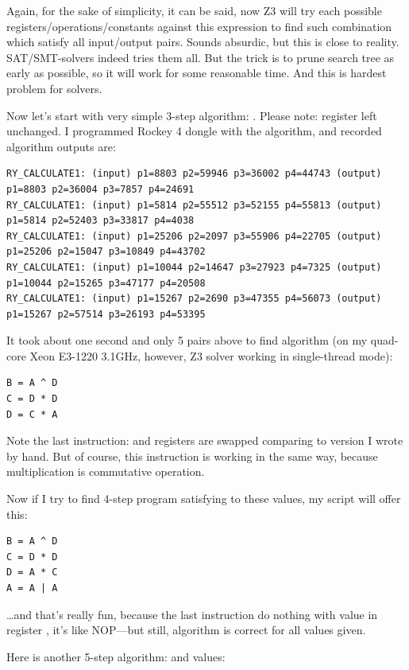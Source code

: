 Again, for the sake of simplicity, it can be said, now Z3 will try each possible
registers/operations/constants against this expression to find such combination which satisfy all input/output pairs. 
Sounds absurdic, but this is close to reality.
SAT/SMT-solvers indeed tries them all.
But the trick is to prune search tree as early as possible, so it will work for some reasonable time.
And this is hardest problem for solvers.

Now let's start with very simple 3-step algorithm: .
Please note: register  left unchanged.
I programmed Rockey 4 dongle with the algorithm, and recorded algorithm outputs are:

\begin{lstlisting}
RY_CALCULATE1: (input) p1=8803 p2=59946 p3=36002 p4=44743 (output) p1=8803 p2=36004 p3=7857 p4=24691
RY_CALCULATE1: (input) p1=5814 p2=55512 p3=52155 p4=55813 (output) p1=5814 p2=52403 p3=33817 p4=4038
RY_CALCULATE1: (input) p1=25206 p2=2097 p3=55906 p4=22705 (output) p1=25206 p2=15047 p3=10849 p4=43702
RY_CALCULATE1: (input) p1=10044 p2=14647 p3=27923 p4=7325 (output) p1=10044 p2=15265 p3=47177 p4=20508
RY_CALCULATE1: (input) p1=15267 p2=2690 p3=47355 p4=56073 (output) p1=15267 p2=57514 p3=26193 p4=53395
\end{lstlisting}

It took about one second and only 5 pairs above to find algorithm
(on my quad-core Xeon E3-1220 3.1GHz, however, Z3 solver working in single-thread mode):

\begin{lstlisting}
B = A ^ D
C = D * D
D = C * A
\end{lstlisting}

Note the last instruction:  and  registers are swapped comparing to version I wrote by hand. 
But of course, this instruction is working in the same way, because multiplication is commutative operation.

Now if I try to find 4-step program satisfying to these values, my script will offer this:

\begin{lstlisting}
B = A ^ D
C = D * D
D = A * C
A = A | A
\end{lstlisting}

\dots and that's really fun, because the last instruction do nothing with value in register ,
it's like \ac{NOP}---but still, algorithm is correct for all values given.

Here is another 5-step algorithm:  and values:


